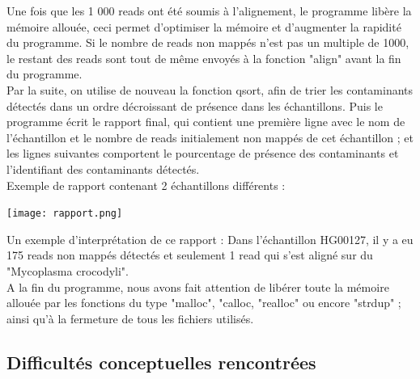 \documentclass[a4paper,12pt]{article}
\begin{document}
Une fois que les 1 000 reads ont été soumis à l'alignement, le programme libère la mémoire allouée, ceci permet d'optimiser la mémoire et d'augmenter la rapidité du programme. Si le nombre de reads non mappés n'est pas un multiple de 1000, le restant des reads sont tout de même envoyés à la fonction "align" avant la fin du programme. \\


Par la suite, on utilise de nouveau la fonction qsort, afin de trier les contaminants détectés dans un ordre décroissant de présence dans les échantillons. Puis le programme écrit le rapport final, qui contient une première ligne avec le nom de l'échantillon et le nombre de reads initialement non mappés de cet échantillon ; et les lignes suivantes comportent le pourcentage de présence des contaminants et l'identifiant des contaminants détectés.\\

Exemple de rapport contenant 2 échantillons différents :  \begin{center}
 \texttt{[image: rapport.png]}~\\ \end{center}

Un exemple d'interprétation de ce rapport : Dans l'échantillon HG00127, il y a eu 175 reads non mappés détectés et seulement 1 read qui s'est aligné sur du "Mycoplasma crocodyli". \\

A la fin du programme, nous avons fait attention de libérer toute la mémoire allouée par les fonctions du type "malloc", "calloc, "realloc" ou encore "strdup" ; ainsi qu'à la fermeture de tous les fichiers utilisés.


\subsection{Difficultés conceptuelles rencontrées}
\end{document}
